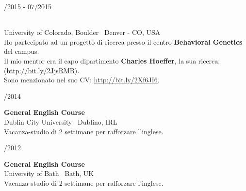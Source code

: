 \begin{minipage}{.3\textwidth}
	/2015 - 07/2015 \faCalendar
\end{minipage}
\hfill
\begin{minipage}{.65\textwidth}
	\vfill
	 \\
	\color{Maroon} University of Colorado, Boulder \color{Sepia} \hfill \faMapMarker \ Denver - CO, USA
	\smallskip
	\\
	\color{gray} Ho partecipato ad un progetto di ricerca presso il centro \textbf{Behavioral Genetics} del campus. \\ Il mio mentor era il capo dipartimento \textbf{Charles Hoeffer}, la sua ricerca: (\url{http://bit.ly/2JjsRMB}). \\ Sono menzionato nel suo CV: \url{http://bit.ly/2Xf6JI6}.
	\vfill
\end{minipage}

\bigskip

\begin{minipage}{.3\textwidth}
	/2014 \faCalendar
\end{minipage}
\hfill
\begin{minipage}{.65\textwidth}
	\vfill
	{\large \textbf{General English Course}} \\
	\color{Maroon} Dublin City University \color{Sepia} \hfill \faMapMarker \ Dublino, IRL 
	\smallskip \\
	\color{gray} Vacanza-studio di 2 settimane per rafforzare l'inglese.
	\vfill
\end{minipage}

\bigskip

\begin{minipage}{.3\textwidth}
	/2012 \faCalendar
\end{minipage}
\hfill
\begin{minipage}{.64\textwidth}
	\vfill
	{\large \textbf{General English Course}} \\
	\color{Maroon} University of Bath \color{Sepia} \hfill \faMapMarker \ Bath, UK 
	\smallskip \\
	\color{gray} Vacanza-studio di 2 settimane per rafforzare l'inglese.
	\vfill
\end{minipage}